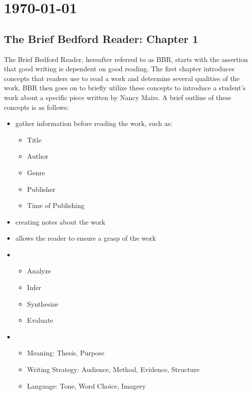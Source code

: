 \documentclass[journal.tex]{subfiles}
\begin{document}
\pagebreak
\section*{\today}

\subsection*{The Brief Bedford Reader: Chapter 1}

The Brief Bedford Reader, hereafter referred to as BBR, starts with the assertion that good writing is dependent on good reading.
The first chapter introduces concepts that readers use to read a work and determine several qualities of the work.
BBR then goes on to briefly utilize these concepts to introduce a student's work about a specific piece written by Nancy Mairs.
A brief outline of these concepts is as follows:

\begin{itemize}
    \item {} gather information before reading the work, such as:
    \begin{itemize}
        \item Title
        \item Author
        \item Genre
        \item Publisher
        \item Time of Publishing
    \end{itemize}

    \item {} creating notes about the work
    \item {} allows the reader to ensure a grasp of the work
    
    \item {}
    \begin{itemize}
        \item Analyze
        \item Infer
        \item Synthesize
        \item Evaluate
    \end{itemize}
    
    \item {}
    \begin{itemize}
        \item Meaning: Thesis, Purpose
        \item Writing Strategy: Audience, Method, Evidence, Structure
        \item Language: Tone, Word Choice, Imagery
    \end{itemize}
\end{itemize}
\end{document}
